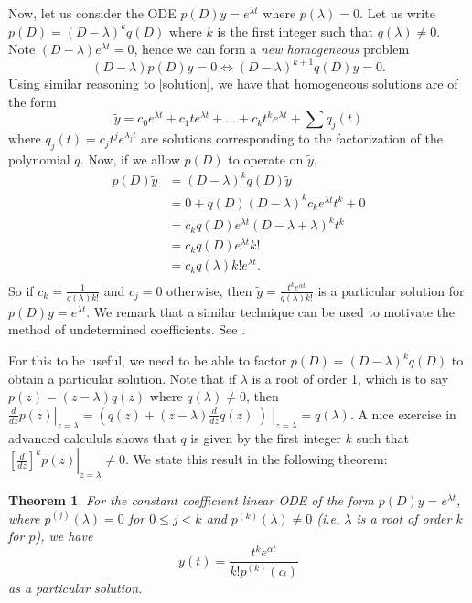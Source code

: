 \documentclass{homework} %
\newtheorem{thm}{Theorem}
\begin{document}
Now, let us consider the ODE $p(D) y = e^{\lambda t}$ where $p(\lambda) = 0$. Let us write $p(D) = (D-\lambda)^kq(D)$ where $k$ is the first integer such that $q(\lambda) \not=0$.  Note $(D-\lambda) e^{\lambda t} = 0$, hence we can form a \emph{new homogeneous} problem
\begin{equation}
  (D-\lambda)p(D) y = 0 \iff (D-\lambda)^{k+1}q(D) y = 0.
\end{equation}
Using similar reasoning to \eqref{solution}, we have that homogeneous solutions are of the form
\begin{equation}
  \tilde y = c_0e^{\lambda t} + c_1t e^{\lambda t} + \dots + c_kt^k e^{\lambda t} + \sum q_{j}(t) \label{newhomo}
\end{equation}
where $q_j(t)=c_jt^je^{\lambda_j t}$ are solutions corresponding to the factorization of the polynomial $q$. Now, if we allow $p(D)$ to operate on $\tilde y$, 
\begin{align*}
  p(D) \tilde y 
    &= (D-\lambda)^k q(D) \tilde y \\
    &= 0 + q(D) (D-\lambda)^k c_k e^{\lambda t} t^k + 0 \\
    &= c_k q(D) e^{\lambda t} (D-\lambda + \lambda)^k t^k \\
    &= c_k q(D) e^{\lambda t} k! \\
    &= c_k q(\lambda) k!e^{\lambda t}.\\
\end{align*}
So if $c_k = \frac 1{q(\lambda)k!}$ and $c_j = 0$ otherwise, then $\tilde y = \frac{t^k e^{\alpha t}}{q(\lambda)k!}$ is a particular solution for $p(D)y = e^{\lambda t}$. We remark that a similar technique can be used to motivate the method of undetermined coefficients.  See \cite{mit}.

For this to be useful, we need to be able to factor $p(D) = (D-\lambda)^k q(D)$
to obtain a particular solution. Note that if $\lambda$ is a root of order 1,
which is to say $p(z) = (z-\lambda)q(z)$ where $q(\lambda) \not=0$, then
$\left.\frac d{dz} p(z)\right|_{z=\lambda} = \left(q(z) +
(z-\lambda)\frac{d}{dz} q(z)\middle)\right|_{z=\lambda} = q(\lambda)$. A nice
exercise in advanced calcululs shows that $q$ is given by the first integer $k$
such that $\left.\left[\frac d{dz}\right]^kp(z)\right|_{z=\lambda} \not=0$.  We state this
result in the following theorem:
\begin{thm}
  For the constant coefficient linear ODE of the form $p(D) y = e^{\lambda t}$, where $p^{(j)}(\lambda)=0$ for $0\le j <k$ and $p^{(k)}(\lambda) \not= 0$ (i.e. $\lambda$ is a root of order $k$ for $p$), we have $$y(t) = \frac{t^k e^{\alpha t}}{k!p^{(k)}(\alpha)}$$ as a particular solution.
\end{thm}
\end{document}
